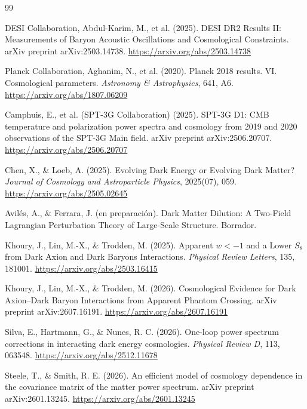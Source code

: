 \documentclass[letterpaper, 12pt]{article}
\begin{document}
    \begin{thebibliography}{99}

         DESI Collaboration, Abdul-Karim, M., et al. (2025). DESI DR2 Results II: Measurements of Baryon Acoustic Oscillations and Cosmological Constraints. arXiv preprint arXiv:2503.14738. \url{https://arxiv.org/abs/2503.14738}

         Planck Collaboration, Aghanim, N., et al. (2020). Planck 2018 results. VI. Cosmological parameters. \textit{Astronomy \& Astrophysics}, 641, A6. \url{https://arxiv.org/abs/1807.06209}

         Camphuis, E., et al. (SPT-3G Collaboration) (2025). SPT-3G D1: CMB temperature and polarization power spectra and cosmology from 2019 and 2020 observations of the SPT-3G Main field. arXiv preprint arXiv:2506.20707. \url{https://arxiv.org/abs/2506.20707}

         Chen, X., \& Loeb, A. (2025). Evolving Dark Energy or Evolving Dark Matter? \textit{Journal of Cosmology and Astroparticle Physics}, 2025(07), 059. \url{https://arxiv.org/abs/2505.02645}

         Avilés, A., \& Ferrara, J. (en preparación). Dark Matter Dilution: A Two-Field Lagrangian Perturbation Theory of Large-Scale Structure. Borrador.

         Khoury, J., Lin, M.-X., \& Trodden, M. (2025). Apparent $w<-1$ and a Lower $S_8$ from Dark Axion and Dark Baryons Interactions. \textit{Physical Review Letters}, 135, 181001. \url{https://arxiv.org/abs/2503.16415}

         Khoury, J., Lin, M.-X., \& Trodden, M. (2026). Cosmological Evidence for Dark Axion--Dark Baryon Interactions from Apparent Phantom Crossing. arXiv preprint arXiv:2607.16191. \url{https://arxiv.org/abs/2607.16191}

         Silva, E., Hartmann, G., \& Nunes, R. C. (2026). One-loop power spectrum corrections in interacting dark energy cosmologies. \textit{Physical Review D}, 113, 063548. \url{https://arxiv.org/abs/2512.11678}

         Steele, T., \& Smith, R. E. (2026). An efficient model of cosmology dependence in the covariance matrix of the matter power spectrum. arXiv preprint arXiv:2601.13245. \url{https://arxiv.org/abs/2601.13245}


\end{thebibliography}
\end{document}
